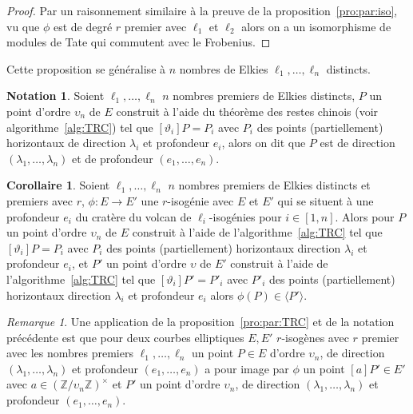 \documentclass[10pt,a4paper]{book}
\theoremstyle{plain}
\theoremstyle{definition}
\theoremstyle{definition}
\newtheorem{cor}[thm]{Corollaire}
\theoremstyle{definition}
\theoremstyle{definition}
\theoremstyle{remark}
\newtheorem{rem}[thm]{Remarque}
\theoremstyle{remark}
\theoremstyle{definition}
\newtheorem{nota}[thm]{Notation}
\begin{document}
\begin{proof}
Par un raisonnement similaire à la preuve de la proposition~\ref{pro:par:iso}, 
vu que $\phi$ est de degré $r$ premier avec $\ell_1$ et $\ell_2$ alors on a un 
isomorphisme de modules de Tate qui commutent avec le Frobenius.
\end{proof}

Cette proposition se généralise à $n$ nombres de Elkies $\ell_1, \dots, \ell_n$
distincts.

\begin{nota}
Soient $\ell_1, \dots, \ell_n$ $n$ nombres premiers de Elkies distincts, $P$ un
 point d'ordre $\upsilon_n$ de $E$ construit à l'aide du 
 théorème des restes chinois (voir algorithme~\ref{alg:TRC}) tel que 
$[\vartheta_i]P=P_i$ avec $P_i$ des points (partiellement) horizontaux de 
direction $\lambda_i$ et profondeur $e_i$, alors 
on dit que $P$ est de direction $(\lambda_1, \dots, \lambda_n)$ et de 
profondeur $(e_1, \dots, e_n)$. 
\end{nota}

\begin{cor}
Soient $\ell_1, \dots, \ell_n$ $n$ nombres premiers de Elkies distincts et 
premiers avec $r$, $\phi: E \rightarrow E'$ une $r$-isogénie avec $E$ et $E'$ 
qui se situent à une profondeur $e_i$ du cratère du volcan de 
$\ell_i$-isogénies pour $i \in [1,n]$. Alors pour $P$ un
 point d'ordre $\upsilon_n$ de $E$ construit à l'aide de 
l'algorithme~\ref{alg:TRC} tel que $[\vartheta_i]P=P_i$ 
avec $P_i$ des points (partiellement) horizontaux direction $\lambda_i$ et 
profondeur $e_i$, et $P'$ un point d'ordre $\upsilon$ de $E'$ construit à 
l'aide de l'algorithme~\ref{alg:TRC} tel que $[\vartheta_i]P'=P'_i$ avec $P'_i$
des points (partiellement) horizontaux direction $\lambda_i$ et profondeur 
$e_i$ alors $\phi(P) \in \langle P' \rangle$. 
\end{cor}


\begin{rem}
Une application de la proposition~\ref{pro:par:TRC} et de la notation 
précédente est que pour deux courbes elliptiques $E,E'$ $r$-isogènes avec $r$ 
premier avec les nombres premiers $\ell_1, \dots, \ell_n$ un point $P \in E$ 
d'ordre $\upsilon_n$, de direction $(\lambda_1, \dots, \lambda_n)$ et 
profondeur $(e_1, \dots, e_n)$ a pour image par $\phi$ un point $[a]P' \in E'$
avec $a \in (\mathbb{Z}/\upsilon_n \mathbb{Z})^{\times}$ et $P'$ un 
point d'ordre $\upsilon_n$, de direction $(\lambda_1, \dots, \lambda_n)$ et 
profondeur $(e_1, \dots, e_n)$.
\end{rem}
\end{document}
